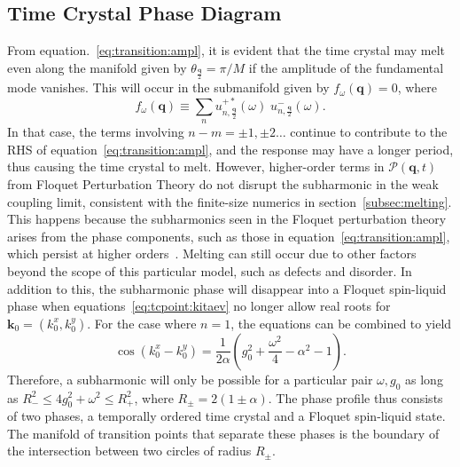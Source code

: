 \documentclass[preprint,5p,times,twocolumn]{elsarticle}
\newcommand{\bmk}{\bm{k}}
\newcommand{\bmq}{\bm{q}}
\begin{document}
\subsection{Time Crystal Phase Diagram}
\label{subsec:phasediag}
From equation.~\ref{eq:transition:ampl}, it is evident that the time crystal may melt even along the manifold given by $\theta_{\frac{\bmq}{2}}=\pi/M$ if the amplitude of the fundamental mode vanishes. This will occur in the submanifold given by $f_{\omega}(\bmq)=0$, where
\begin{equation}
f_{\omega}(\bmq) \equiv \sum_n u_{n,\frac{\bmq}{2}}^{+\ast}(\omega)\; u_{n,\frac{\bmq}{2}}^{-}(\omega).
\label{eq:subh:melts}
\end{equation}
In that case, the terms involving $n-m=\pm 1, \pm 2 \dots$ continue to contribute to the RHS of equation~\ref{eq:transition:ampl}, and the response may have a longer period, thus causing the time crystal to melt. However, higher-order terms in $\mathcal{P}(\bmq, t)$ from Floquet Perturbation Theory do not disrupt the subharmonic in the weak coupling limit, consistent with the finite-size numerics in section~\ref{subsec:melting}. This happens because the subharmonics seen in the Floquet perturbation theory arises from the phase components, such as those in equation~\ref{eq:transition:ampl}, which persist at higher orders~\citep{PhysRevA.91.033601}. Melting can still occur due to other factors beyond the scope of this particular model, such as defects and disorder.
In addition to this, the subharmonic phase will disappear into a Floquet spin-liquid phase when equations~\ref{eq:tcpoint:kitaev} no longer allow real roots for $\bmk_0=\left(k^x_0, k^y_0\right)$. For the case where $n=1$, the equations can be combined to yield
\begin{equation}
\cos(k^x_0 - k^y_0) = \frac{1}{2\alpha}\left(g^2_0 + \frac{\omega^2}{4}-\alpha^2-1\right).
\end{equation}
Therefore, a subharmonic will only be possible for a particular pair $\omega, g_0$ as long as $R^2_-\leq4g^2_0+\omega^2\leq R_+^2$, where $R_\pm = 2\left(1\pm\alpha\right)$. The phase profile thus consists of two phases, a temporally ordered time crystal and a Floquet spin-liquid state. The manifold of transition points that separate these phases is the boundary of the intersection between two circles of radius $R_\pm$. 
\end{document}
